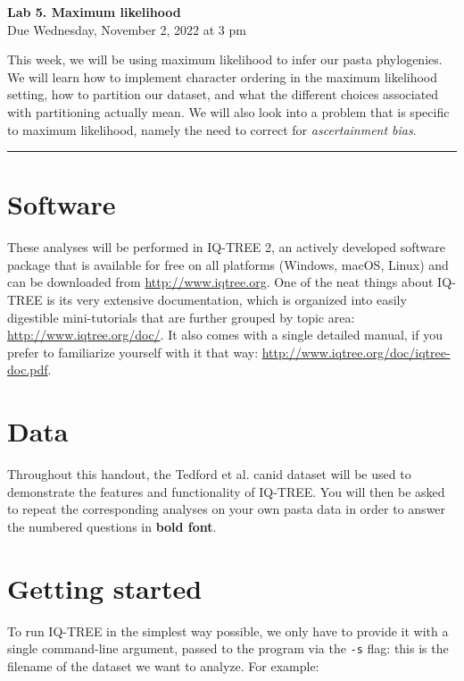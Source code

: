 \documentclass[12pt]{article}
\begin{document}
\frenchspacing

\begin{center}
{\Large \textbf{Lab 5. Maximum likelihood}} \\[0.5cm]
{\large Due Wednesday, November 2, 2022 at 3 pm}
\end{center}

\vspace{1cm}

\noindent This week, we will be using maximum likelihood to infer our pasta phylogenies. We will learn how to implement character ordering in the maximum likelihood setting, how to partition our dataset, and what the different choices associated with partitioning actually mean. We will also look into a problem that is specific to maximum likelihood, namely the need to correct for \textit{ascertainment bias}. \\

\hrule

\section*{Software}

 These analyses will be performed in IQ-TREE 2, an actively developed software package that is available for free on all platforms (Windows, macOS, Linux) and can be downloaded from \url{http://www.iqtree.org}. One of the neat things about IQ-TREE is its very extensive documentation, which is organized into easily digestible mini-tutorials that are further grouped by topic area: \url{http://www.iqtree.org/doc/}. It also comes with a single detailed manual, if you prefer to familiarize yourself with it that way: \url{http://www.iqtree.org/doc/iqtree-doc.pdf}.
 
\section*{Data}

Throughout this handout, the Tedford et al. canid dataset will be used to demonstrate the features and functionality of IQ-TREE. You will then be asked to repeat the corresponding analyses on your own pasta data in order to answer the numbered questions in \textbf{bold font}.

\section*{Getting started}

To run IQ-TREE in the simplest way possible, we only have to provide it with a single command-line argument, passed to the program via the \texttt{-s} flag: this is the filename of the dataset we want to analyze. For example: \\
\end{document}
